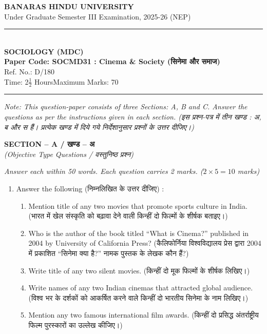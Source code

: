 \documentclass[11pt,a4paper]{article}
\begin{document}
\begin{center}
  {\large\bfseries BANARAS HINDU UNIVERSITY}\\[2pt]
  {\normalsize Under Graduate Semester III Examination, 2025-26 (NEP)}\\[6pt]
  \rule{0.8\linewidth}{0.5pt}\\[6pt]
  {\large\bfseries SOCIOLOGY (MDC)}\\[4pt]
  {\large\bfseries Paper Code: SOCMD31 : Cinema \& Society (सिनेमा और समाज)}\\[2pt]
  {\small Ref. No.: D/180}\\[4pt]
  {\normalsize Time: 2$\frac{1}{2}$ Hours\hfill Maximum Marks: 70}
\end{center}

\rule{\linewidth}{0.4pt}

\smallskip

\noindent \textit{Note: This question-paper consists of three Sections: A, B and C. Answer the questions as per the instructions given in each section. (इस प्रश्न-पत्र में तीन खण्ड : अ, ब और स हैं। प्रत्येक खण्ड में दिये गये निर्देशानुसार प्रश्नों के उत्तर दीजिए।)}

\bigskip

\begin{center}
  \textbf{SECTION -- A / खण्ड -- अ}\\
  \textit{(Objective Type Questions / वस्तुनिष्ठ प्रश्न)}
\end{center}
\noindent \textit{Answer each within 50 words. Each question carries 2 marks. ($2 \times 5 = 10$ marks)}

\begin{enumerate}[label=\textbf{\arabic*.}]
  \item Answer the following (निम्नलिखित के उत्तर दीजिए) :
  \begin{enumerate}[label=(\roman*)]
    \item Mention title of any two movies that promote sports culture in India. (भारत में खेल संस्कृति को बढ़ावा देने वाली किन्हीं दो फिल्मों के शीर्षक बताइए।)
    \item Who is the author of the book titled ``What is Cinema?'' published in 2004 by University of California Press? (कैलिफोर्निया विश्वविद्यालय प्रेस द्वारा 2004 में प्रकाशित ``सिनेमा क्या है?'' नामक पुस्तक के लेखक कौन हैं?)
    \item Write title of any two silent movies. (किन्हीं दो मूक फिल्मों के शीर्षक लिखिए।)
    \item Write names of any two Indian cinemas that attracted global audience. (विश्व भर के दर्शकों को आकर्षित करने वाले किन्हीं दो भारतीय सिनेमा के नाम लिखिए।)
    \item Mention any two famous international film awards. (किन्हीं दो प्रसिद्ध अंतर्राष्ट्रीय फिल्म पुरस्कारों का उल्लेख कीजिए।)
  \end{enumerate}
\end{enumerate}
\end{document}
